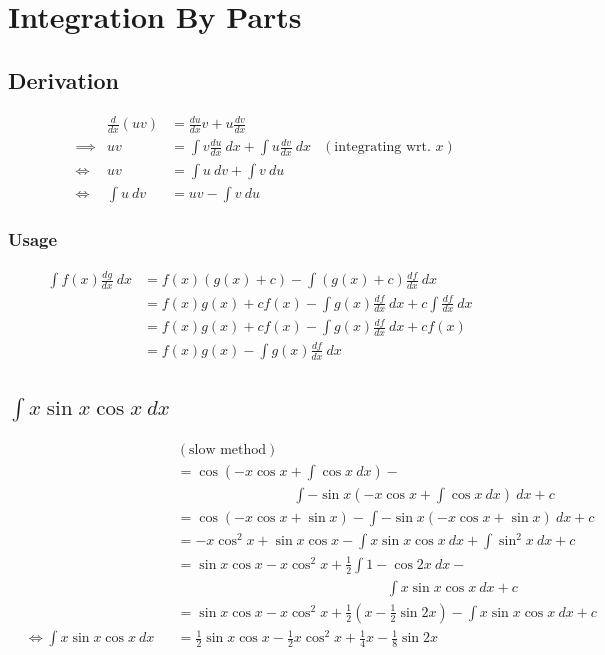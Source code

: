\documentclass[MathsNotesBase.tex]{subfiles}
\begin{document}
\section*{Integration By Parts}
\bigskip

  \subsection*{Derivation}
  \begin{align*}
      &&\frac{d}{dx}(uv) &= \frac{du}{dx}v + u\frac{dv}{dx} &\\
      &\implies &uv &= \int{v\frac{du}{dx}}\ dx + \int{u\frac{dv}{dx}}\ dx  &(\text{integrating wrt. $x$})\\
      &\iff &uv &= \int{u}\ dv + \int{v}\ du &\\
      &\iff &\int{u}\ dv &= uv - \int{v}\ du &
  \end{align*}
  
    \subsubsection*{Usage}
    \begin{align*}
      \int{f(x)\frac{dg}{dx}}\ dx &= f(x)(g(x) + c) - \int{(g(x) + c)\frac{df}{dx}}\ dx \\
      &= f(x)g(x) + cf(x) - \int{g(x)\frac{df}{dx}}\ dx + c\int{\frac{df}{dx}}\ dx \\
      &= f(x)g(x) + cf(x) - \int{g(x)\frac{df}{dx}}\ dx + cf(x) \\
      &= f(x)g(x) - \int{g(x)\frac{df}{dx}}\ dx \\
    \end{align*}
    
  
  \subsection*{$\int{x\sin{x}\cos{x}\ dx}$}
  \begin{align*}
      &&&(\text{slow method})\\
      &&&= \cos(-x\cos{x} + \int{\cos{x}\ dx}) - \\
      &&&\hspace{100pt}\int{-\sin{x}(-x\cos{x} + \int{\cos{x}\ dx})}\ dx + c \\
      &&&= \cos(-x\cos{x} + \sin{x}) - \int{-\sin{x}(-x\cos{x} + \sin{x})}\ dx + c &\\
      &&&= -x\cos^2{x} + \sin{x}\cos{x} - \int{x\sin{x}\cos{x}}\ dx + \int{\sin^2{x}}\ dx + c &\\
      &&&= \sin{x}\cos{x} - x\cos^2{x} + \frac{1}{2}\int{1 - \cos{2x}}\ dx -\\ &&&\hspace{180pt}\int{x\sin{x}\cos{x}}\ dx + c &\\
      &&&= \sin{x}\cos{x} - x\cos^2{x} + \frac{1}{2}(x - \frac{1}{2}\sin{2x}) - \int{x\sin{x}\cos{x}}\ dx + c &\\
      &\iff \int{x\sin{x}\cos{x}\ dx} &&= \frac{1}{2}\sin{x}\cos{x} - \frac{1}{2}x\cos^2{x} + \frac{1}{4}x - \frac{1}{8}\sin{2x}
  \end{align*}
  
\end{document}
